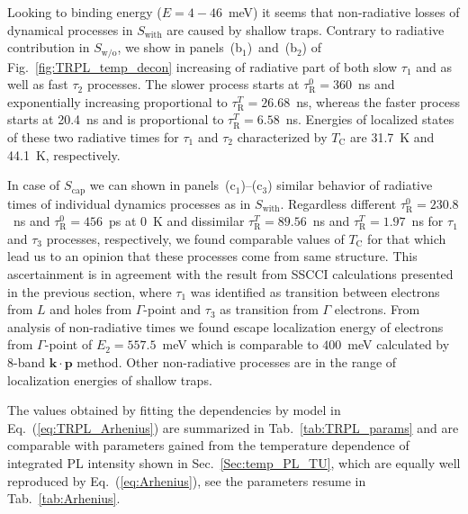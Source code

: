 Looking to binding energy ($E=4-46$~meV) it seems that non-radiative losses of dynamical processes in $S_\mathrm{with}$ are caused by shallow traps. Contrary to radiative contribution in $S_\mathrm{w/o}$, we show in panels~(b$_1$)~and~(b$_2$) of Fig.~\ref{fig:TRPL_temp_decon} increasing of radiative part of both slow $\tau_1$ and as well as fast $\tau_2$ processes. The slower process starts at $\tau_\mathrm{R}^0=360$~ns and exponentially increasing proportional to $\tau_\mathrm{R}^T=26.68$~ns, whereas the faster process starts at 20.4~ns and is proportional to $\tau_\mathrm{R}^T=6.58$~ns. Energies of localized states of these two radiative times for $\tau_1$ and $\tau_2$ characterized by $T_\mathrm{C}$ are 31.7~K and 44.1~K, respectively.

In case of $S_\mathrm{cap}$ we can shown in panels~(c$_1$)--(c$_3$) similar behavior of radiative times of individual dynamics processes as in $S_\mathrm{with}$. Regardless different $\tau_\mathrm{R}^0=230.8$~ns and $\tau_\mathrm{R}^0=456$~ps at 0~K and dissimilar $\tau_\mathrm{R}^T=89.56$~ns and $\tau_\mathrm{R}^T=1.97$~ns for $\tau_1$ and $\tau_3$ processes, respectively, we found comparable values of $T_\mathrm{C}$ for that which lead us to an opinion that these processes come from same structure. This ascertainment is in agreement with the result from SSCCI calculations presented in the previous section, where $\tau_1$ was identified as transition between electrons from $L$ and holes from $\Gamma$-point and $\tau_3$ as transition from $\Gamma$ electrons. From analysis of non-radiative times we found escape localization energy of electrons from $\Gamma$-point of $E_2=557.5$~meV which is comparable to $400$~meV calculated by 8-band $\mathbf{k \cdot p}$ method. Other non-radiative processes are in the range of localization energies of shallow traps.



The values obtained by fitting the dependencies by model in Eq.~(\ref{eq:TRPL_Arhenius}) are summarized in Tab.~\ref{tab:TRPL_params} and are comparable with parameters gained from the temperature dependence of integrated PL intensity shown in Sec.~\ref{Sec:temp_PL_TU}, which are equally well reproduced by Eq.~(\ref{eq:Arhenius}), see the parameters resume in Tab.~\ref{tab:Arhenius}.

